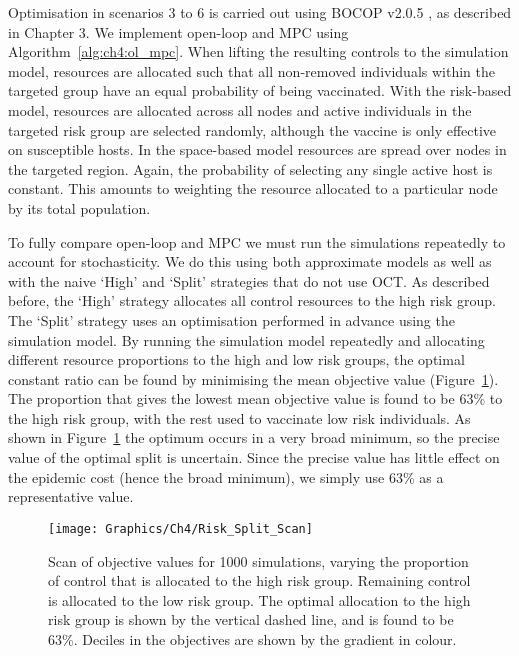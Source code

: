 Optimisation in scenarios 3 to 6 is carried out using BOCOP v2.0.5 \citep{bocop}, as described in Chapter 3. We implement open-loop and MPC using Algorithm~\ref{alg:ch4:ol_mpc}. When lifting the resulting controls to the simulation model, resources are allocated such that all non-removed individuals within the targeted group have an equal probability of being vaccinated. With the risk-based model, resources are allocated across all nodes and active individuals in the targeted risk group are selected randomly, although the vaccine is only effective on susceptible hosts. In the space-based model resources are spread over nodes in the targeted region. Again, the probability of selecting any single active host is constant. This amounts to weighting the resource allocated to a particular node by its total population.

To fully compare open-loop and MPC we must run the simulations repeatedly to account for stochasticity. We do this using both approximate models as well as with the naive `High' and `Split' strategies that do not use OCT. As described before, the `High' strategy allocates all control resources to the high risk group. The `Split' strategy uses an optimisation performed in advance using the simulation model. By running the simulation model repeatedly and allocating different resource proportions to the high and low risk groups, the optimal constant ratio can be found by minimising the mean objective value (Figure~\ref{fig:ch4:risk_split_scan}). The proportion that gives the lowest mean objective value is found to be 63\% to the high risk group, with the rest used to vaccinate low risk individuals. As shown in Figure~\ref{fig:ch4:risk_split_scan} the optimum occurs in a very broad minimum, so the precise value of the optimal split is uncertain. Since the precise value has little effect on the epidemic cost (hence the broad minimum), we simply use 63\% as a representative value.

\begin{figure}[t!]
    \begin{center}
        \texttt{[image: Graphics/Ch4/Risk\_Split\_Scan]}
        \caption[Optimisation of the Split strategy]{Scan of objective values for 1000 simulations, varying the proportion of control that is allocated to the high risk group. Remaining control is allocated to the low risk group. The optimal allocation to the high risk group is shown by the vertical dashed line, and is found to be 63\%. Deciles in the objectives are shown by the gradient in colour.}
        \label{fig:ch4:risk_split_scan}
    \end{center}
\end{figure}

